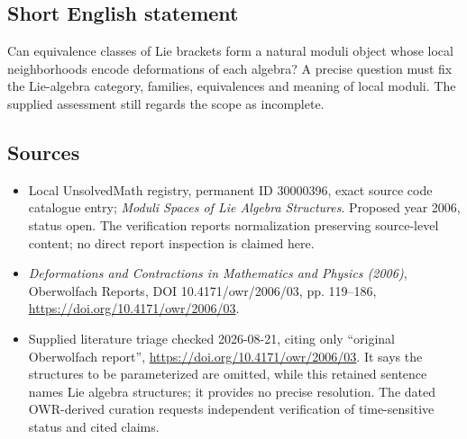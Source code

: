 \documentclass[11pt]{article}
\begin{document}
\subsection{Short English statement}
Can equivalence classes of Lie brackets form a natural moduli object whose local neighborhoods encode deformations of each algebra? A precise question must fix the Lie-algebra category, families, equivalences and meaning of local moduli. The supplied assessment still regards the scope as incomplete.
\subsection{Sources}
\begin{itemize}
\item Local UnsolvedMath registry, permanent ID 30000396, exact source code catalogue entry; \emph{Moduli Spaces of Lie Algebra Structures}. Proposed year 2006, status open. The verification reports normalization preserving source-level content; no direct report inspection is claimed here.
\item \emph{Deformations and Contractions in Mathematics and Physics (2006)}, Oberwolfach Reports, DOI 10.4171/owr/2006/03, pp. 119--186, \url{https://doi.org/10.4171/owr/2006/03}.
\item Supplied literature triage checked 2026-08-21, citing only ``original Oberwolfach report'', \url{https://doi.org/10.4171/owr/2006/03}. It says the structures to be parameterized are omitted, while this retained sentence names Lie algebra structures; it provides no precise resolution. The dated OWR-derived curation requests independent verification of time-sensitive status and cited claims.
\end{itemize}
\end{document}
